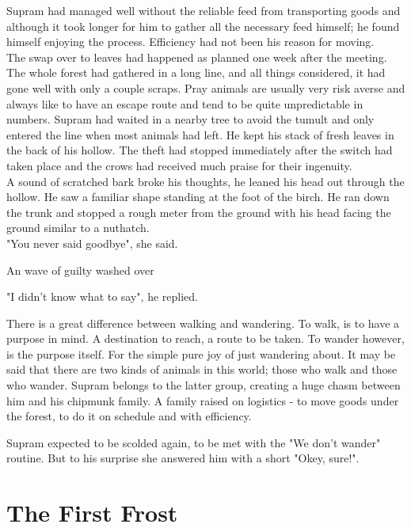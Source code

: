\documentclass[smalldemyvopaper,11pt,twoside,onecolumn,openright,extrafontsizes]{memoir}
\begin{document}
Supram had managed well without the reliable feed from transporting goods and although it took longer for him to gather all the necessary feed himself; he found himself enjoying the process. Efficiency had not been his reason for moving.\\

The swap over to leaves had happened as planned one week after the meeting. The whole forest had gathered in a long line, and all things considered, it had gone well with only a couple scraps. Pray animals are usually very risk averse and always like to have an escape route and tend to be quite unpredictable in numbers. Supram had waited in a nearby tree to avoid the tumult and only entered the line when most animals had left. He kept his stack of fresh leaves in the back of his hollow. The theft had stopped immediately after the switch had taken place and the crows had received much praise for their ingenuity.\\

A sound of scratched bark broke his thoughts, he leaned his head out through the hollow. He saw a familiar shape standing at the foot of the birch. He ran down the trunk and stopped a rough meter from the ground with his head facing the ground similar to a nuthatch.\\

"You never said goodbye", she said. 

An wave of guilty washed over

"I didn't know what to say", he replied.

 



There is a great difference between walking and wandering. To walk, is to have a purpose in mind. A destination to reach, a route to be taken. To wander however, is the purpose itself. For the simple pure joy of just wandering about. It may be said that there are two kinds of animals in this world; those who walk and those who wander. Supram belongs to the latter group, creating a huge chasm between him and his chipmunk family. A family raised on logistics - to move goods under the forest, to do it on schedule and with efficiency. 

Supram expected to be scolded again, to be met with the "We don't wander" routine. But to his surprise she answered him with a short "Okey, sure!".



 

\chapter{The First Frost}
\end{document}
